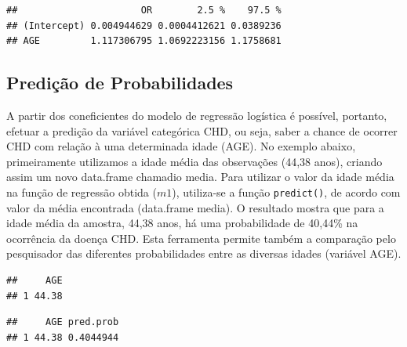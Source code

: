 \documentclass[12pt,brazil,]{book}
\newenvironment{Shaded}{\begin{snugshade}}{\end{snugshade}}
\newcommand{\DataTypeTok}[1]{\textcolor[rgb]{0.13,0.29,0.53}{#1}}
\newcommand{\KeywordTok}[1]{\textcolor[rgb]{0.13,0.29,0.53}{\textbf{#1}}}
\newcommand{\NormalTok}[1]{#1}
\newcommand{\OperatorTok}[1]{\textcolor[rgb]{0.81,0.36,0.00}{\textbf{#1}}}
\newcommand{\StringTok}[1]{\textcolor[rgb]{0.31,0.60,0.02}{#1}}
\begin{document}
\begin{verbatim}
##                      OR        2.5 %    97.5 %
## (Intercept) 0.004944629 0.0004412621 0.0389236
## AGE         1.117306795 1.0692223156 1.1758681
\end{verbatim}

\hypertarget{predicao-de-probabilidades}{%
\subsection{Predição de
Probabilidades}\label{predicao-de-probabilidades}}

A partir dos coneficientes do modelo de regressão logística é possível,
portanto, efetuar a predição da variável categórica CHD, ou seja, saber
a chance de ocorrer CHD com relação à uma determinada idade (AGE). No
exemplo abaixo, primeiramente utilizamos a idade média das observações
(44,38 anos), criando assim um novo data.frame chamadio media. Para
utilizar o valor da idade média na função de regressão obtida (\(m1\)),
utiliza-se a função \texttt{predict()}, de acordo com valor da média
encontrada (data.frame media). O resultado mostra que para a idade média
da amostra, 44,38 anos, há uma probabilidade de 40,44\% na ocorrência da
doença CHD. Esta ferramenta permite também a comparação pelo pesquisador
das diferentes probabilidades entre as diversas idades (variável AGE).

\begin{Shaded}
\end{Shaded}

\begin{verbatim}
##     AGE
## 1 44.38
\end{verbatim}

\begin{Shaded}
\end{Shaded}

\begin{verbatim}
##     AGE pred.prob
## 1 44.38 0.4044944
\end{verbatim}
\end{document}
